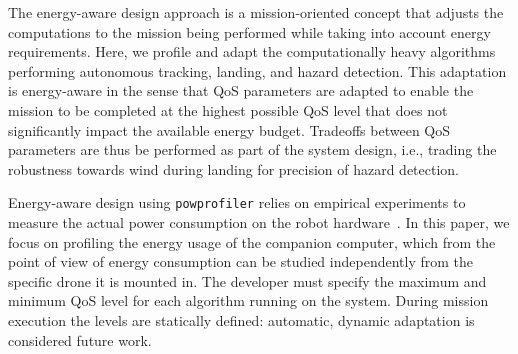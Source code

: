 \documentclass[conference]{IEEEtran}
\newcommand{\stt}[1]{{\small\tt #1}} %
\newcommand{\powprof}{\stt{powprofiler}}
\begin{document}
The energy-aware design approach is a mission-oriented concept that adjusts
the computations to the mission being performed while taking into
account energy requirements. %
Here, we profile and adapt the
computationally heavy algorithms performing autonomous tracking,
landing, and hazard detection. This adaptation is energy-aware
in the sense that QoS parameters are adapted
to enable the mission to be completed at the highest possible QoS
level that does not significantly impact the available energy budget. Tradeoffs
between QoS parameters are thus be performed as part of the system design, i.e., trading
the robustness towards wind during landing for precision of hazard
detection.

Energy-aware design using \powprof{} relies on empirical
experiments to measure the actual power consumption on the robot
hardware~\cite{seewald2019coarse}.
%
In this paper, we focus on 
profiling the energy usage of the companion computer,
which from the point of view of energy consumption
can be studied independently from the specific drone it is mounted in.
%
The developer must specify the maximum and minimum QoS level for
each algorithm running on the system.  During mission execution the
levels are statically defined: automatic, dynamic adaptation %
is 
considered future work.
\end{document}
